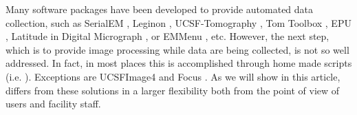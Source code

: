Many software packages have been developed to provide automated data collection, such as SerialEM \citep{Mastronarde2005}, Leginon \citep{Suloway2009}, UCSF-Tomography \citep{Zheng2007}, Tom Toolbox \citep{Nickell2005}, EPU \citep{EPU}, Latitude in Digital Micrograph \citep{Latitude}, or EMMenu \citep{emmenu}, etc. However, the next step,  which is to provide image processing while  data are being collected, is not so well addressed. In fact, in most places this is accomplished through home made scripts (i.e. \citep{Pichkur2018}). Exceptions are UCSFImage4 \citep{Li2015} and Focus \citep{Biyani2017}. As we will show in this article, \scipion differs from these solutions in a larger flexibility both from the point of view of users and facility staff.

